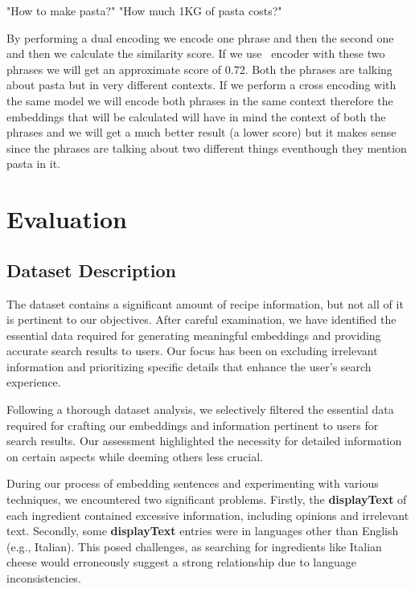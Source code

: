 \documentclass[runningheads]{llncs}
\begin{document}
\hspace{0.5cm} %
\begin{minipage}{1.2\textwidth} %
\begin{dialogue}
 "How to make pasta?"
 "How much 1KG of pasta costs?"\\[5pt]
\end{dialogue}
\end{minipage}
By performing a dual encoding we encode one phrase and then the second one and then we calculate the similarity score. If we use~\cite{reimers-2019-sentence-bert} encoder with these two phrases we will get an approximate score of 0.72. Both the phrases are talking about pasta but in very different contexts. If we perform a cross encoding with the same model we will encode both phrases in the same context therefore the embeddings that will be calculated will have in mind the context of both the phrases and we will get a much better result (a lower score) but it makes sense since the phrases are talking about two different things eventhough they mention pasta in it.
\section{Evaluation}
\subsection{Dataset Description}
The dataset contains a significant amount of recipe information, but not all of it is pertinent to our objectives. After careful examination, we have identified the essential data required for generating meaningful embeddings and providing accurate search results to users. Our focus has been on excluding irrelevant information and prioritizing specific details that enhance the user's search experience.

Following a thorough dataset analysis, we selectively filtered the essential data required for crafting our embeddings and information pertinent to users for search results. Our assessment highlighted the necessity for detailed information on certain aspects while deeming others less crucial.

During our process of embedding sentences and experimenting with various techniques, we encountered two significant problems. Firstly, the \textbf{displayText} of each ingredient contained excessive information, including opinions and irrelevant text. Secondly, some \textbf{displayText} entries were in languages other than English (e.g., Italian). This posed challenges, as searching for ingredients like Italian cheese would erroneously suggest a strong relationship due to language inconsistencies.
\end{document}
